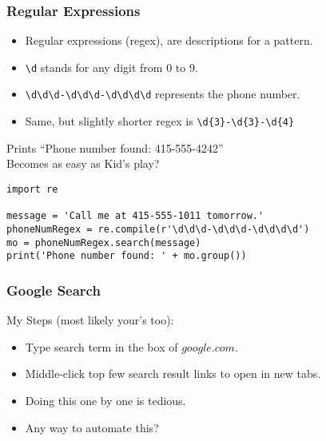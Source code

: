 \begin{frame}[fragile]\frametitle{Regular Expressions}
\begin{itemize}
\item Regular expressions (regex), are descriptions for a pattern.
\item \lstinline{\d} stands for any digit from 0 to 9.
\item \lstinline{\d\d\d-\d\d\d-\d\d\d\d} represents the phone number.
\item Same, but slightly shorter regex is \lstinline|\d{3}-\d{3}-\d{4}|
\end{itemize}

Prints ``Phone number found: 415-555-4242'' \\
Becomes as easy as Kid's play?

\begin{lstlisting}
import re

message = 'Call me at 415-555-1011 tomorrow.'
phoneNumRegex = re.compile(r'\d\d\d-\d\d\d-\d\d\d\d')
mo = phoneNumRegex.search(message)
print('Phone number found: ' + mo.group())
\end{lstlisting}

\end{frame}

\begin{frame}[fragile]\frametitle{Google Search}
My Steps (most likely your's too):
\begin{itemize}
\item Type search term in the box of $google.com$.
\item Middle-click top few search result links to open in new tabs.
\item Doing this one by one is tedious.
\item Any way to automate this?
\end{itemize}
\end{frame}


